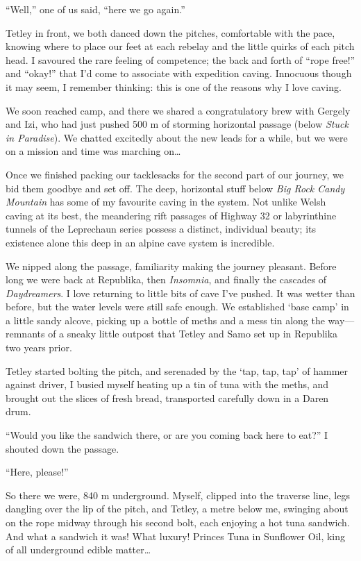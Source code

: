 ``Well,'' one of us said, ``here we go again.''

Tetley in front, we both danced down the pitches, comfortable with the
pace, knowing where to place our feet at each rebelay and the little
quirks of each pitch head. I savoured the rare feeling of competence;
the back and forth of ``rope free!'' and ``okay!'' that I'd come to
associate with expedition caving. Innocuous though it may seem, I
remember thinking: this is one of the reasons why I love caving.

We soon reached camp, and there we shared a congratulatory brew with
Gergely and Izi, who had just pushed 500 m of storming horizontal
passage (below \emph{Stuck in Paradise}). We chatted excitedly about the
new leads for a while, but we were on a mission and time was marching
on\ldots{}

Once we finished packing our tacklesacks for the second part of our
journey, we bid them goodbye and set off. The deep, horizontal stuff
below \emph{Big Rock Candy Mountain} has some of my favourite caving in
the system. Not unlike Welsh caving at its best, the meandering rift
passages of Highway 32 or labyrinthine tunnels of the Leprechaun series
possess a distinct, individual beauty; its existence alone this deep in
an alpine cave system is incredible.

We nipped along the passage, familiarity making the journey pleasant.
Before long we were back at Republika, then \emph{Insomnia}, and finally
the cascades of \emph{Daydreamers}. I love returning to little bits of
cave I've pushed. It was wetter than before, but the water levels were
still safe enough. We established `base camp' in a little sandy alcove,
picking up a bottle of meths and a mess tin along the way---remnants of
a sneaky little outpost that Tetley and Samo set up in Republika two
years prior.

Tetley started bolting the pitch, and serenaded by the `tap, tap, tap'
of hammer against driver, I busied myself heating up a tin of tuna with
the meths, and brought out the slices of fresh bread, transported
carefully down in a Daren drum.

``Would you like the sandwich there, or are you coming back here to
eat?'' I shouted down the passage.

``Here, please!''

So there we were, 840 m underground. Myself, clipped into the traverse
line, legs dangling over the lip of the pitch, and Tetley, a metre below
me, swinging about on the rope midway through his second bolt, each
enjoying a hot tuna sandwich. And what a sandwich it was! What luxury!
Princes Tuna in Sunflower Oil, king of all underground edible
matter\ldots{}

